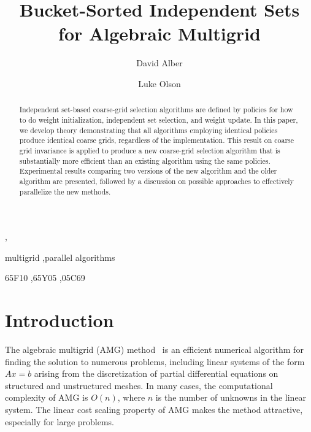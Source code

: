 \documentclass{elsart}
\begin{document}
\begin{frontmatter}


\title{Bucket-Sorted Independent Sets for Algebraic Multigrid}
\author[NREL]{David Alber},
\author[UIUC]{Luke Olson}
\address[NREL]{Scientific Computing Center\\ National Renewable Energy Laboratory}
\address[UIUC]{Department of Computer Science\\ University of Illinois at Urbana-Champaign}

\begin{abstract}
Independent set-based coarse-grid selection algorithms are defined by
policies for how to do weight initialization, independent set
selection, and weight update. In this paper, we develop theory
demonstrating that all algorithms employing identical policies produce
identical coarse grids, regardless of the implementation. This result
on coarse grid invariance is applied to produce a new coarse-grid
selection algorithm that is substantially more efficient than an
existing algorithm using the same policies. Experimental results
comparing two versions of the new algorithm and the older algorithm
are presented, followed by a discussion on possible approaches to
effectively parallelize the new methods.
\end{abstract}

\begin{keyword}
multigrid \sep parallel algorithms

\MSC 65F10 \sep 65Y05 \sep 05C69
\end{keyword}
\end{frontmatter}

\section{Introduction}
\label{sec:intro}
The algebraic multigrid (AMG) method~\cite{Ruge1987,Brandt1982} is an
efficient numerical algorithm for finding the solution to numerous
problems, including linear systems of the form $Ax = b$ arising from
the discretization of partial differential equations on structured and
unstructured meshes. In many cases, the computational complexity of
AMG is $O(n)$, where $n$ is the number of unknowns in the linear
system. The linear cost scaling property of AMG makes the method
attractive, especially for large problems.
\end{document}
